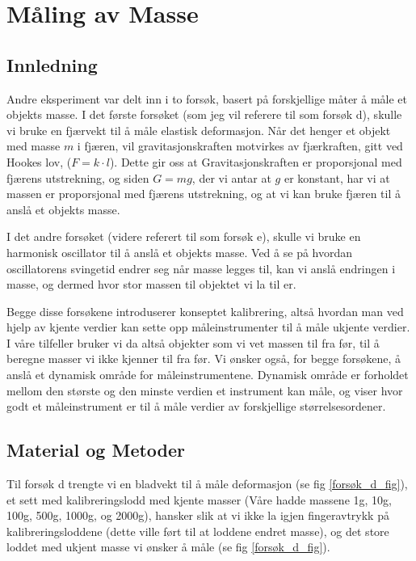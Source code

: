 \section{Måling av Masse}

\subsection{Innledning}

Andre eksperiment var delt inn i to forsøk, basert på forskjellige måter å måle et objekts masse. 
I det første forsøket (som jeg vil referere til som forsøk d), skulle vi bruke en fjærvekt til å måle elastisk deformasjon. Når det henger et objekt med masse $m$ i fjæren, vil gravitasjonskraften motvirkes av fjærkraften, gitt ved Hookes lov, ($F = k\cdot l$). Dette gir oss at Gravitasjonskraften er proporsjonal med fjærens utstrekning, og siden $G = mg$, der vi antar at $g$ er konstant, har vi at massen er proporsjonal med fjærens utstrekning, og at vi kan bruke fjæren til å anslå et objekts masse. \medskip

I det andre forsøket (videre referert til som forsøk e), skulle vi bruke en harmonisk oscillator til å anslå et objekts masse. Ved å se på hvordan oscillatorens svingetid endrer seg når masse legges til, kan vi anslå endringen i masse, og dermed hvor stor massen til objektet vi la til er. \medskip

Begge disse forsøkene introduserer konseptet kalibrering, altså hvordan man ved hjelp av kjente verdier kan sette opp måleinstrumenter til å måle ukjente verdier. I våre tilfeller bruker vi da altså objekter som vi vet massen til fra før, til å beregne masser vi ikke kjenner til fra før. Vi ønsker også, for begge forsøkene, å anslå et dynamisk område for måleinstrumentene. Dynamisk område er forholdet mellom den største og den minste verdien et instrument kan måle, og viser hvor godt et måleinstrument er til å måle verdier av forskjellige størrelsesordener.

\subsection{Material og Metoder}

Til forsøk d trengte vi en bladvekt til å måle deformasjon (se fig \ref{forsøk_d_fig}), et sett med kalibreringslodd med kjente masser (Våre hadde massene 1g, 10g, 100g, 500g, 1000g, og 2000g), hansker slik at vi ikke la igjen fingeravtrykk på kalibreringsloddene (dette ville ført til at loddene endret masse), og det store loddet med ukjent masse vi ønsker å måle (se fig \ref{forsøk_d_fig}).

